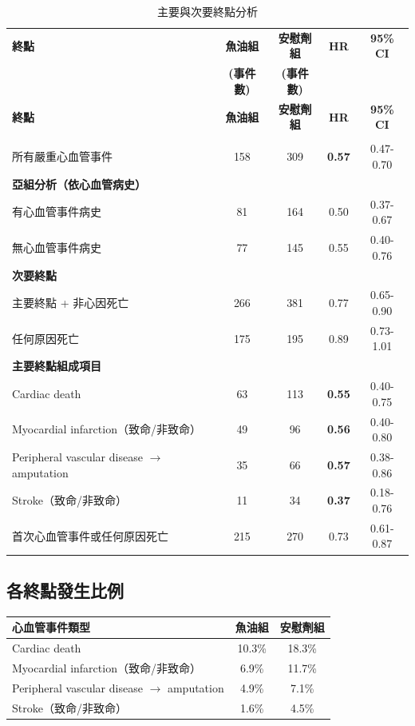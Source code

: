 \documentclass[12pt,a4paper]{article}
\begin{document}
\begin{longtable}{p{5.5cm}cccc}
\caption{主要與次要終點分析} \\
\toprule
\textbf{終點} & \textbf{魚油組} & \textbf{安慰劑組} & \textbf{HR} & \textbf{95\% CI} \\
 & \textbf{(事件數)} & \textbf{(事件數)} & & \\
\midrule
\endfirsthead

\toprule
\textbf{終點} & \textbf{魚油組} & \textbf{安慰劑組} & \textbf{HR} & \textbf{95\% CI} \\
\midrule
\endhead

\bottomrule
\endfoot

\multicolumn{5}{l}{\textbf{主要終點}} \\
所有嚴重心血管事件 & 158 & 309 & \textbf{0.57} & 0.47-0.70 \\
\midrule
\multicolumn{5}{l}{\textbf{亞組分析（依心血管病史）}} \\
有心血管事件病史 & 81 & 164 & 0.50 & 0.37-0.67 \\
無心血管事件病史 & 77 & 145 & 0.55 & 0.40-0.76 \\
\midrule
\multicolumn{5}{l}{\textbf{次要終點}} \\
主要終點 + 非心因死亡 & 266 & 381 & 0.77 & 0.65-0.90 \\
任何原因死亡 & 175 & 195 & 0.89 & 0.73-1.01 \\
\midrule
\multicolumn{5}{l}{\textbf{主要終點組成項目}} \\
Cardiac death & 63 & 113 & \textbf{0.55} & 0.40-0.75 \\
Myocardial infarction（致命/非致命） & 49 & 96 & \textbf{0.56} & 0.40-0.80 \\
Peripheral vascular disease $\rightarrow$ amputation & 35 & 66 & \textbf{0.57} & 0.38-0.86 \\
Stroke（致命/非致命） & 11 & 34 & \textbf{0.37} & 0.18-0.76 \\
\midrule
首次心血管事件或任何原因死亡 & 215 & 270 & 0.73 & 0.61-0.87 \\
\bottomrule
\end{longtable}

\subsection{各終點發生比例}

\begin{longtable}{p{6cm}cc}
\toprule
\textbf{心血管事件類型} & \textbf{魚油組} & \textbf{安慰劑組} \\
\midrule
\endfirsthead

\bottomrule
\endfoot

Cardiac death & 10.3\% & 18.3\% \\
Myocardial infarction（致命/非致命） & 6.9\% & 11.7\% \\
Peripheral vascular disease $\rightarrow$ amputation & 4.9\% & 7.1\% \\
Stroke（致命/非致命） & 1.6\% & 4.5\% \\
\bottomrule
\end{longtable}
\end{document}
